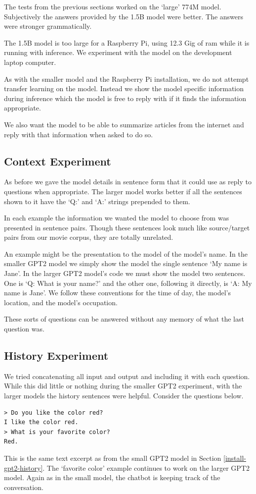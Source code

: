 The tests from the previous sections worked on the `large' 774M model. Subjectively the answers provided by the 1.5B model were better. The answers were stronger grammatically.

The 1.5B model is too large for a Raspberry Pi, using 12.3 Gig of ram while it is running with inference. We experiment with the model on the development laptop computer.

As with the smaller model and the Raspberry Pi installation, we do not attempt transfer learning on the model. Instead we show the model specific information during inference which the model is free to reply with if it finds the information appropriate.

We also want the model to be able to summarize articles from the internet and reply with that information when asked to do so. 

\label{chapter-gpt2-xl-intro}

\subsection{Context Experiment}

As before we gave the model details in sentence form that it could use as reply to questions when appropriate. The larger model works better if all the sentences shown to it have the `Q:' and `A:' strings prepended to them. 

In each example the information we wanted the model to choose from was presented in sentence pairs. Though these sentences look much like source/target pairs from our movie corpus, they are totally unrelated.

An example might be the presentation to the model of the model's name. In the smaller GPT2 model we simply show the model the single sentence `My name is Jane'. In the larger GPT2 model's code we must show the model two sentences. One is `Q: What is your name?' and the other one, following it directly, is `A: My name is Jane'. We follow these conventions for the time of day, the model's location, and the model's occupation.

These sorts of questions can be answered without any memory of what the last question was.

\subsection{History Experiment}

We tried concatenating all input and output and including it with each question. While this did little or nothing during the smaller GPT2 experiment, with the larger models the history sentences were helpful. Consider the questions below.
\begin{verbatim}
> Do you like the color red?
I like the color red.
> What is your favorite color?
Red.
\end{verbatim}
This is the same text excerpt as from the small GPT2 model in Section \ref{install-gpt2-history}. The `favorite color' example continues to work on the larger GPT2 model. Again as in the small model, the chatbot is keeping track of the conversation. 

